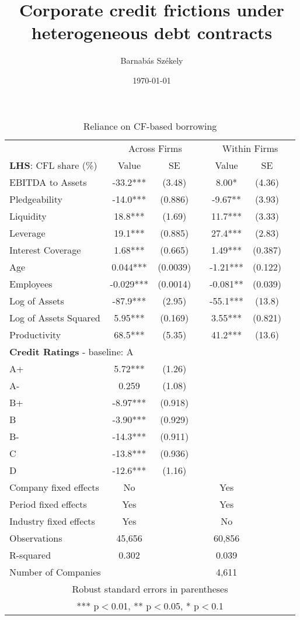 \documentclass[12pt]{article}
\title{Corporate credit frictions under heterogeneous debt contracts}
\date{}
\begin{document}
\author{Barnabás Székely}
\date{\today}
\vspace{-1in}

\begin{table}[H]
    \centering
    \caption{Reliance on CF-based borrowing}
    \small
    \label{tab:your_table_label}
    \begin{tabular}{lcccccc}
    \toprule
    & \multicolumn{3}{c}{Across Firms} & \multicolumn{3}{c}{Within Firms} \\
    \cmidrule(lr){2-4} \cmidrule(lr){5-7}
    \textbf{LHS}: CFL share (\%) & Value & SE & & Value & SE & \\
    \midrule
    EBITDA to Assets & -33.2*** & (3.48) & & 8.00* & (4.36) & \\
    Pledgeability & -14.0*** & (0.886) & & -9.67** & (3.93) & \\
    Liquidity & 18.8*** & (1.69) & & 11.7*** & (3.33) & \\
    Leverage & 19.1*** & (0.885) & & 27.4*** & (2.83) & \\
    Interest Coverage & 1.68*** & (0.665) & & 1.49*** & (0.387) & \\
    Age & 0.044*** & (0.0039) & & -1.21*** & (0.122) & \\
    Employees & -0.029*** & (0.0014) & & -0.081** & (0.039) & \\
    Log of Assets & -87.9*** & (2.95) & & -55.1*** & (13.8) & \\
    Log of Assets Squared & 5.95*** & (0.169) & & 3.55*** & (0.821) & \\
    Productivity & 68.5*** & (5.35) & & 41.2*** & (13.6) & \vspace{2mm} \\
    \multicolumn{7}{l}{\textbf{Credit Ratings} - baseline: A} \\
    A+  & 5.72*** & (1.26) & & & & \\
    A-  & 0.259 & (1.08) & & & & \\
    B+  & -8.97*** & (0.918) & & & & \\
    B   & -3.90*** & (0.929) & & & & \\
    B-  & -14.3*** & (0.911) & & & & \\
    C   & -13.8*** & (0.936) & & & & \\
    D   & -12.6*** & (1.16) & & & & \vspace{2mm} \\
    \hline
    Company fixed effects & No & & & Yes & & \\
    Period fixed effects & Yes & & & Yes & & \\
    Industry fixed effects & Yes & & & No & & \\
    Observations & 45,656 & & & 60,856 & & \\
    R-squared & 0.302 & & & 0.039 & & \\
    Number of Companies & & & & 4,611 & & \\
    \bottomrule
    \multicolumn{7}{c}{Robust standard errors in parentheses} \\
    \multicolumn{7}{c}{*** p$<$0.01, ** p$<$0.05, * p$<$0.1} \\
    \end{tabular}%
\end{table}
\end{document}
